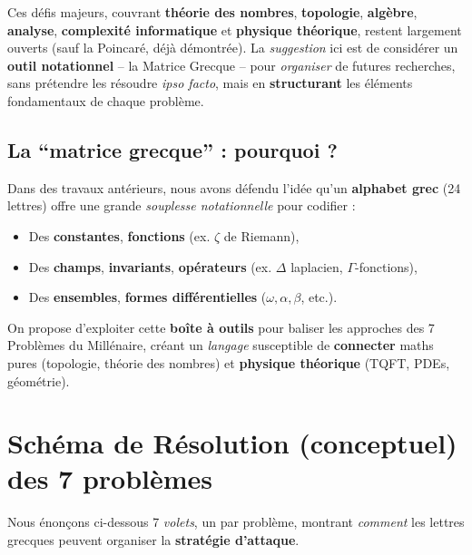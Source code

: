 \documentclass[12pt]{article}
\begin{document}
Ces défis majeurs, couvrant \textbf{théorie des nombres}, \textbf{topologie}, \textbf{algèbre}, 
\textbf{analyse}, \textbf{complexité informatique} et \textbf{physique théorique}, 
restent largement ouverts (sauf la Poincaré, déjà démontrée). 
La \emph{suggestion} ici est de considérer un \textbf{outil notationnel} -- 
la \og Matrice Grecque \fg{} -- pour \emph{organiser} de futures recherches, 
sans prétendre les résoudre \emph{ipso facto}, mais en \textbf{structurant} 
les éléments fondamentaux de chaque problème.

\subsection{La “matrice grecque” : pourquoi ?}
Dans des travaux antérieurs, nous avons défendu l'idée qu'un \textbf{alphabet grec} 
(24 lettres) offre une grande \emph{souplesse notationnelle} pour codifier :
\begin{itemize}
    \item Des \textbf{constantes}, \textbf{fonctions} (ex. \(\zeta\) de Riemann), 
    \item Des \textbf{champs}, \textbf{invariants}, \textbf{opérateurs} (ex. \(\Delta\) laplacien, \(\Gamma\)-fonctions),
    \item Des \textbf{ensembles}, \textbf{formes différentielles} (\(\omega, \alpha, \beta\), etc.).
\end{itemize}
On propose d’exploiter cette \textbf{boîte à outils} pour baliser les approches 
des 7 Problèmes du Millénaire, créant un \emph{langage} susceptible de \textbf{connecter} 
maths pures (topologie, théorie des nombres) et \textbf{physique théorique} (TQFT, PDEs, géométrie).

\section{Schéma de Résolution (conceptuel) des 7 problèmes}
\label{sec:7problems}

Nous énonçons ci-dessous 7 \emph{volets}, un par problème, montrant \emph{comment} 
les lettres grecques peuvent organiser la \textbf{stratégie d’attaque}.
\end{document}
